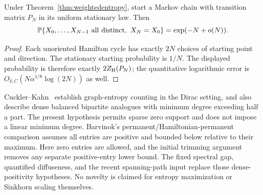 \begin{corollary}
\label{cor:markovhamiltonentropy}
Under Theorem~\ref{thm:weightedentropy}, start a Markov chain
with transition matrix \(P_N\) in its uniform stationary law.
Then
\[
 {\mathbb P}\{X_0,\ldots,X_{N-1}\ {\rm all\ distinct},
                        \ X_N=X_0\}=\exp(-N+o(N)).
\]
\end{corollary}
\begin{proof}
Each unoriented Hamilton cycle has exactly \(2N\)
choices of starting point and direction.
The stationary starting probability is \(1/N\).
The displayed probability is therefore exactly
\(2Z_{\rm H}(P_N)\); the quantitative logarithmic error is
\(O_{\delta,C}(N\alpha^{1/8}\log(2N))\) as well.
\end{proof}

\begin{remark}
Cuckler--Kahn~\cite{CK} establish graph-entropy counting in
the Dirac setting, and also describe dense balanced bipartite
analogues with minimum degree exceeding half a part.
The present hypothesis permits sparse zero support and
does not impose a linear minimum degree.
Barvinok's permanent/Hamiltonian-permanent comparison
\cite[Theorem 1.2]{Barvinok} assumes all entries are positive
and bounded below relative to their maximum.
Here zero entries are allowed, and the initial trimming
argument removes any separate positive-entry lower bound.
The fixed spectral gap, quantified diffuseness, and the
recent spanning-path input replace those dense-positivity
hypotheses. No novelty is claimed for entropy maximization
or Sinkhorn scaling themselves.
\end{remark}
